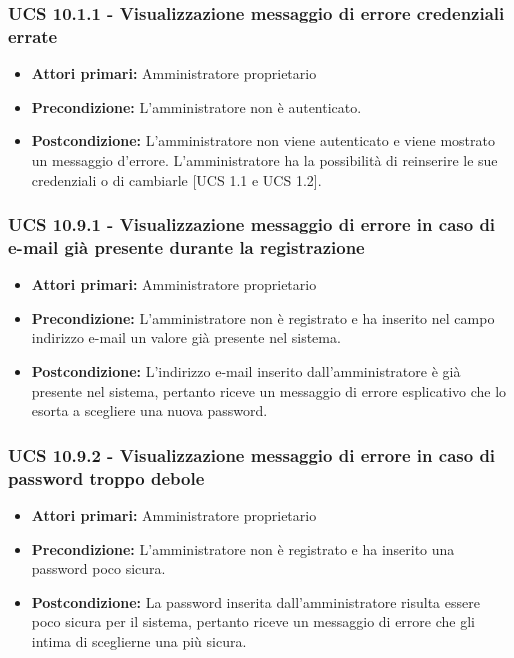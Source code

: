 \subsubsection{UCS 10.1.1 - Visualizzazione messaggio di errore credenziali errate}%
\begin{itemize}
\item \textbf{Attori primari:} Amministratore proprietario
\item \textbf{Precondizione:} L'amministratore non è autenticato.
\item \textbf{Postcondizione:} L'amministratore non viene autenticato e viene mostrato un messaggio d'errore. L'amministratore ha la possibilità di reinserire le sue credenziali o di cambiarle [UCS 1.1 e UCS 1.2].
\end{itemize}

\subsubsection{UCS 10.9.1 - Visualizzazione messaggio di errore in caso di e-mail già presente durante la registrazione}%
\begin{itemize}
    \item \textbf{Attori primari:} Amministratore proprietario
    \item \textbf{Precondizione:} L'amministratore non è registrato e ha inserito nel campo indirizzo e-mail un valore già presente nel sistema.
    \item \textbf{Postcondizione:} L'indirizzo e-mail inserito dall'amministratore è già presente nel sistema, pertanto riceve un messaggio di errore esplicativo che lo esorta a scegliere una nuova password.
\end{itemize}

\subsubsection{UCS 10.9.2 - Visualizzazione messaggio di errore in caso di password troppo debole}%
\begin{itemize}
\item \textbf{Attori primari:} Amministratore proprietario
\item \textbf{Precondizione:} L'amministratore non è registrato e ha inserito una password poco sicura.
\item \textbf{Postcondizione:} La password inserita dall'amministratore risulta essere poco sicura per il sistema, pertanto riceve un messaggio di errore che gli intima di sceglierne una più sicura.
\end{itemize}

